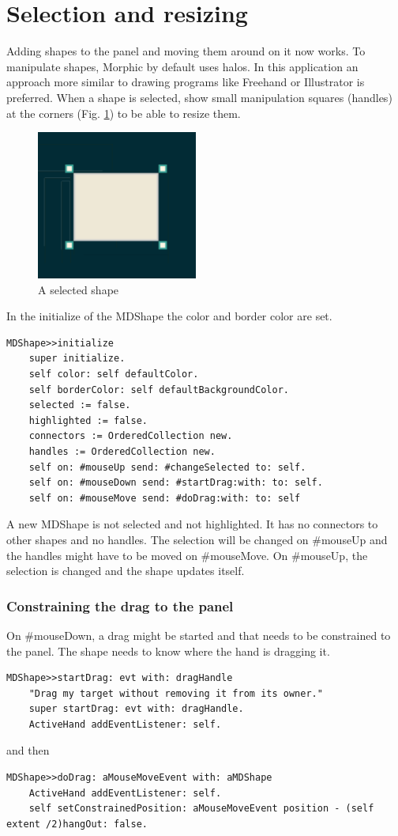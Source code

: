 \documentclass[10pt]{article}   	%
\begin{document}
\section{Selection and resizing}
Adding shapes to the panel and moving them around on it now works.
To manipulate shapes, Morphic by default uses halos. In this application
an approach more similar to drawing programs like Freehand or Illustrator
is preferred. When a shape is selected, show small manipulation squares
(handles) at the corners (Fig. \ref{selectedShape}) to be able to resize them.
\begin{figure}[htb]
\begin{center}
\includegraphics[width=150pt]{SelectedShape.png}
\caption{A selected shape}
\label{selectedShape}
\end{center}
\end{figure}
In the initialize of the MDShape the color and border color
are set.
\begin{verbatim}
MDShape>>initialize
    super initialize.
    self color: self defaultColor.
    self borderColor: self defaultBackgroundColor.
    selected := false.
    highlighted := false.
    connectors := OrderedCollection new.
    handles := OrderedCollection new.
    self on: #mouseUp send: #changeSelected to: self.
    self on: #mouseDown send: #startDrag:with: to: self.
    self on: #mouseMove send: #doDrag:with: to: self
\end{verbatim}
A new MDShape is not selected and not highlighted.
It has no connectors to other shapes and no handles.
The selection will be changed on \#mouseUp and 
the handles might have to be moved on \#mouseMove.
On \#mouseUp, the selection is changed and the shape
updates itself. 
\subsubsection{Constraining the drag to the panel}
On \#mouseDown, a drag might be started
and  that needs to be constrained to the panel.
The shape needs to know where the hand is dragging it. 
\begin{verbatim}
MDShape>>startDrag: evt with: dragHandle
    "Drag my target without removing it from its owner."
    super startDrag: evt with: dragHandle.
    ActiveHand addEventListener: self.
\end{verbatim}
and then
\begin{verbatim}
MDShape>>doDrag: aMouseMoveEvent with: aMDShape 
    ActiveHand addEventListener: self.
    self setConstrainedPosition: aMouseMoveEvent position - (self extent /2)hangOut: false.	
\end{verbatim}
\end{document}
